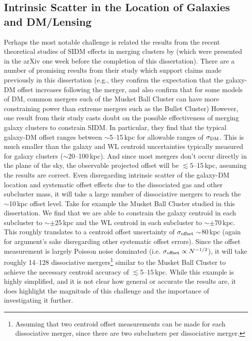 \subsection{Intrinsic Scatter in the Location of Galaxies and DM/Lensing}

Perhaps the most notable challenge is related the results from the recent theoretical studies of SIDM effects in merging clusters by \citet{Kahlhoefer:2013wp} (which were presented in the arXiv one week before the completion of this dissertation).
There are a number of promising results from their study which support claims made previously in this dissertation (e.g., they confirm the expectation that the galaxy-DM offset increases following the merger, and also confirm that for some models of DM, common mergers such of the Musket Ball Cluster can have more constraining power than extreme mergers such as the Bullet Cluster)
However, one result from their study casts doubt on the possible effectiveness of merging galaxy clusters to constrain SIDM.
In particular, they find that the typical galaxy-DM offset ranges between $\sim$5--15\,kpc for allowable ranges of $\sigma_{\rm DM}$.
This is much smaller than the galaxy and WL centroid uncertainties typically measured for galaxy clusters ($\sim$20--100\,kpc).
And since most mergers don't occur directly in the plane of the sky, the observable projected offset will be $\lesssim5$--15\,kpc, assuming the \citet{Kahlhoefer:2013wp} results are correct.
Even disregarding intrinsic scatter of the galaxy-DM location and systematic offset effects due to the dissociated gas and other subcluster mass, it will take a large number of dissociative mergers to reach the $\sim$10\,kpc offset level.
Take for example the Musket Ball Cluster studied in this dissertation.
We find that we are able to constrain the galaxy centroid in each subcluster to $\sim\pm$25\,kpc and the WL centroid in each subcluster to $\sim\pm$70\,kpc.
This roughly translates to a centroid offset uncertainty of $\sigma_{\rm offset}\sim$80\,kpc (again for argument's sake disregarding other systematic offset errors).
Since the offset measurement is largely Poisson noise dominated (i.e. $\sigma_{\rm offset}\propto N^{-1/2}$), it will take roughly 14--128 dissociative mergers\footnote{Assuming that two centroid offset measurements can be made for each dissociative merger, since there are two subclusters per dissociative merger.} similar to the Musket Ball Cluster to achieve the necessary centroid accuracy of $\lesssim$5--15\,kpc.
While this example is highly simplified, and it is not clear how general or accurate the \citet{Kahlhoefer:2013wp} results are,  it does highlight the magnitude of this challenge and the importance of investigating it further.

